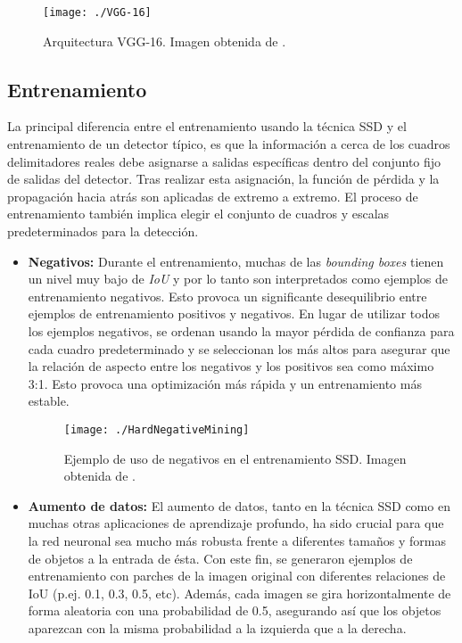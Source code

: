 \documentclass[a4paper, 12pt, oneside]{book}
\begin{document}
\begin{figure}[H]
\begin{center}
\texttt{[image: ./VGG-16]}
\caption{Arquitectura VGG-16. Imagen obtenida de \cite{SSD_2}.}
\label{VGG-16}
\end{center}
\end{figure}

\subsection{Entrenamiento}

La principal diferencia entre el entrenamiento usando la técnica SSD y el entrenamiento de un detector típico, es que la información a cerca de los cuadros delimitadores reales debe asignarse a salidas específicas dentro del conjunto fijo de salidas del detector. Tras realizar esta asignación, la función de pérdida y la propagación hacia atrás son aplicadas de extremo a extremo. El proceso de entrenamiento también implica elegir el conjunto de cuadros y escalas predeterminados para la detección.

\begin{itemize}
\item \textbf{Negativos:} Durante el entrenamiento, muchas de las \textit{bounding boxes} tienen un nivel muy bajo de \textit{IoU} y por lo tanto son interpretados como ejemplos de entrenamiento negativos. Esto provoca un significante desequilibrio entre ejemplos de entrenamiento positivos y negativos. En lugar de utilizar todos los ejemplos negativos, se ordenan usando la mayor pérdida de confianza para cada cuadro predeterminado y se seleccionan los más altos para asegurar que la relación de aspecto entre los negativos y los positivos sea como máximo 3:1. Esto provoca una optimización más rápida y un entrenamiento más estable.\\

\begin{figure}[H]
\begin{center}
\texttt{[image: ./HardNegativeMining]}
\caption{Ejemplo de uso de negativos en el entrenamiento SSD. Imagen obtenida de \cite{SSD_2}.}
\label{VGG-16}
\end{center}
\end{figure}

\item \textbf{Aumento de datos:} El aumento de datos, tanto en la técnica SSD como en muchas otras aplicaciones de aprendizaje profundo, ha sido crucial para que la red neuronal sea mucho más robusta frente a diferentes tamaños y formas de objetos a la entrada de ésta. Con este fin, se generaron ejemplos de entrenamiento con parches de la imagen original con diferentes relaciones de IoU (p.ej. 0.1, 0.3, 0.5, etc). Además, cada imagen se gira horizontalmente de forma aleatoria con una probabilidad de 0.5, asegurando así que los objetos aparezcan con la misma probabilidad a la izquierda que a la derecha. 
\end{itemize}
\end{document}
